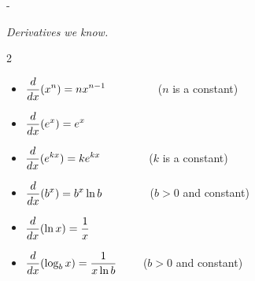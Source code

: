 \documentclass{article}
\makeatletter
\newlength{\tipmargin}
\renewenvironment{framed}{
  \setlength{\tipmargin}{\textwidth-\linewidth}
  \advance\@totalleftmargin-\tipmargin
  \def\FrameCommand{\hspace{\tipmargin}\fbox}%
  \advance\linewidth\tipmargin
  \MakeFramed {\advance\hsize-\width \FrameRestore}%
}
{\endMakeFramed}
\makeatother
\begin{document}
\begin{framed}
  \emph{Derivatives we know.}
  \begin{multicols}{2}
    \begin{itemize}

    \item $\displaystyle \frac{d}{dx} (x^n) = nx^{n-1}$  
      $\qquad   \qquad $  ($n$ is a
      constant)
    \item $\displaystyle \frac{d}{dx} (e^x) = e^x \qquad   \qquad $  
    \item $\displaystyle \frac{d}{dx} (e^{kx}) = ke^{kx}  \qquad   \qquad $ ($k$ is
      a constant)

    \item $\displaystyle \frac{d}{dx} (b^x) = b^x\ln b \qquad \qquad $ ($b>0$ and
      constant)
    \item $\displaystyle \frac{d}{dx} (\ln x) = 
    \frac{1}{x}\qquad \qquad $
    \item $\displaystyle \frac{d}{dx} (\log_b x) = \frac{1}{x\ln b}\qquad $ ($b>0$
      and constant)

    \end{itemize}
  \end{multicols}  
\end{framed}
\end{document}
